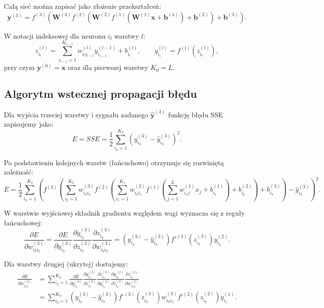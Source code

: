 \documentclass[12pt,twoside]{article}
\begin{document}
Całą sieć można zapisać jako złożenie przekształceń:
\begin{equation}
\mathbf{y}^{(3)} = f^{(3)}\!\left(\mathbf{W}^{(3)} f^{(2)}\!\left(\mathbf{W}^{(2)} f^{(1)}\!\left(\mathbf{W}^{(1)}\mathbf{x}+\mathbf{b}^{(1)}\right)+\mathbf{b}^{(2)}\right)+\mathbf{b}^{(3)}\right).
\end{equation}

W notacji indeksowej dla neuronu $i_l$ warstwy $l$:
\begin{equation}
z_{i_l}^{(l)} = \sum_{i_{l-1}=1}^{K_{l-1}} w_{i_l i_{l-1}}^{(l)} y_{i_{l-1}}^{(l-1)} + b_{i_l}^{(l)},
\qquad
y_{i_l}^{(l)} = f^{(l)}\!\left(z_{i_l}^{(l)}\right),
\end{equation}
przy czym $\mathbf{y}^{(0)}=\mathbf{x}$ oraz dla pierwszej warstwy $K_0=L$.

\subsection{Algorytm wstecznej propagacji błędu}

Dla wyjścia trzeciej warstwy i sygnału zadanego $\hat{\mathbf{y}}^{(3)}$ funkcję błędu SSE zapisujemy jako:
\begin{equation}
E = SSE = \frac{1}{2}\sum_{i_3=1}^{K_3}\left(y_{i_3}^{(3)}-\hat{y}_{i_3}^{(3)}\right)^2.
\end{equation}

Po podstawieniu kolejnych warstw (łańcuchowo) otrzymuje się rozwiniętą zależność:
\begin{equation}
E = \frac{1}{2}\sum_{i_3=1}^{K_3}\left(
f^{(3)}\!\left(\sum_{i_2=1}^{K_2} w_{i_3 i_2}^{(3)}
f^{(2)}\!\left(\sum_{i_1=1}^{K_1} w_{i_2 i_1}^{(2)}
f^{(1)}\!\left(\sum_{j=1}^{L} w_{i_1 j}^{(1)}x_j + b_{i_1}^{(1)}\right)+ b_{i_2}^{(2)}\right)
+ b_{i_3}^{(3)}\right)
-\hat{y}_{i_3}^{(3)}\right)^2.
\end{equation}

W warstwie wyjściowej składnik gradientu względem wagi wyznacza się z reguły łańcuchowej:
\begin{equation}
\frac{\partial E}{\partial w^{(3)}_{i_3 i_2}}
= \frac{\partial E}{\partial y_{i_3}^{(3)}}
\frac{\partial y_{i_3}^{(3)}}{\partial z_{i_3}^{(3)}}
\frac{\partial z_{i_3}^{(3)}}{\partial w^{(3)}_{i_3 i_2}}
= \left(y_{i_3}^{(3)}-\hat{y}_{i_3}^{(3)}\right)
f'^{(3)}\!\left(z_{i_3}^{(3)}\right)
y_{i_2}^{(2)}.
\end{equation}

Dla warstwy drugiej (ukrytej) dostajemy:
\begin{equation}
\begin{aligned}
\frac{\partial E}{\partial w^{(2)}_{i_2 i_1}}
&= \sum_{i_3=1}^{K_3}
\frac{\partial E}{\partial y_{i_3}^{(3)}}
\frac{\partial y_{i_3}^{(3)}}{\partial z_{i_3}^{(3)}}
\frac{\partial z_{i_3}^{(3)}}{\partial y_{i_2}^{(2)}}
\frac{\partial y_{i_2}^{(2)}}{\partial z_{i_2}^{(2)}}
\frac{\partial z_{i_2}^{(2)}}{\partial w^{(2)}_{i_2 i_1}} \\
&= \sum_{i_3=1}^{K_3}
\left(y_{i_3}^{(3)}-\hat{y}_{i_3}^{(3)}\right)
f'^{(3)}\!\left(z_{i_3}^{(3)}\right)
w^{(3)}_{i_3 i_2}
f'^{(2)}\!\left(z_{i_2}^{(2)}\right)
y_{i_1}^{(1)}.
\end{aligned}
\end{equation}
\end{document}
